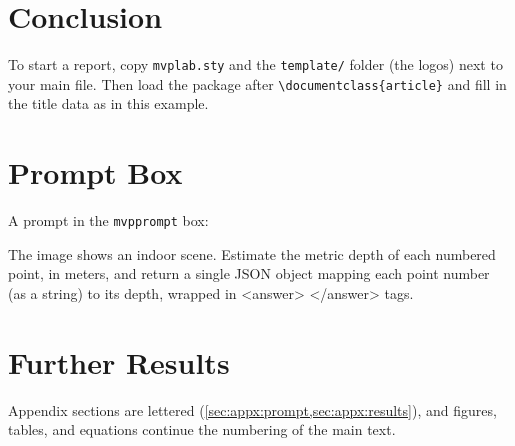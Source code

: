 \documentclass[10pt,letterpaper]{article}
\begin{document}
\section{Conclusion}
\label{sec:conclusion}
To start a report, copy \texttt{mvplab.sty} and the \texttt{template/} folder (the logos) next to your main
file. Then load the package after \verb|\documentclass{article}| and fill in the title data as in this example.

{
  \small
  
  
}

\appendixpage
\appendix

\section{Prompt Box}
\label{sec:appx:prompt}
A prompt in the \verb|mvpprompt| box:
\begin{mvpprompt}
The image shows an indoor scene. Estimate the metric depth of each numbered point, in meters, and return a single
JSON object mapping each point number (as a string) to its depth, wrapped in <answer> </answer> tags.
\end{mvpprompt}

\section{Further Results}
\label{sec:appx:results}
Appendix sections are lettered (\cref{sec:appx:prompt,sec:appx:results}), and figures, tables, and equations continue
the numbering of the main text.
\end{document}
